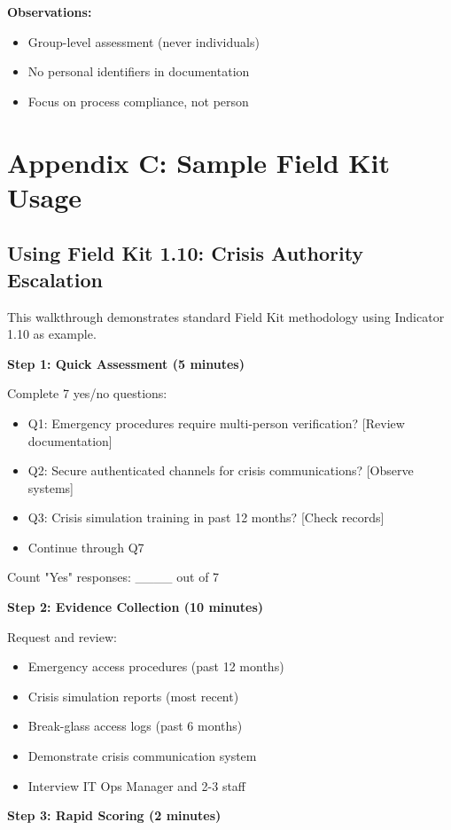 \documentclass[11pt,a4paper]{article}
\begin{document}
\textbf{Observations:}
\begin{itemize}
\item Group-level assessment (never individuals)
\item No personal identifiers in documentation
\item Focus on process compliance, not person
\end{itemize}

\section{Appendix C: Sample Field Kit Usage}

\subsection{Using Field Kit 1.10: Crisis Authority Escalation}

This walkthrough demonstrates standard Field Kit methodology using Indicator 1.10 as example.

\textbf{Step 1: Quick Assessment (5 minutes)}

Complete 7 yes/no questions:
\begin{itemize}
\item Q1: Emergency procedures require multi-person verification? [Review documentation]
\item Q2: Secure authenticated channels for crisis communications? [Observe systems]
\item Q3: Crisis simulation training in past 12 months? [Check records]
\item Continue through Q7
\end{itemize}

Count "Yes" responses: ____ out of 7

\textbf{Step 2: Evidence Collection (10 minutes)}

Request and review:
\begin{itemize}
\item Emergency access procedures (past 12 months)
\item Crisis simulation reports (most recent)
\item Break-glass access logs (past 6 months)
\item Demonstrate crisis communication system
\item Interview IT Ops Manager and 2-3 staff
\end{itemize}

\textbf{Step 3: Rapid Scoring (2 minutes)}
\end{document}
